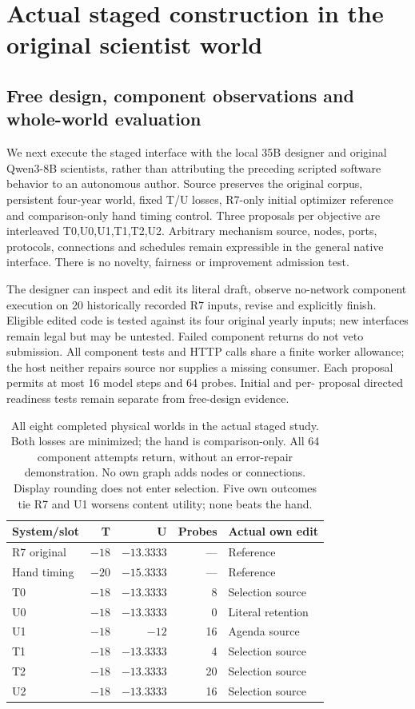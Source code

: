 \section{Actual staged construction in the original scientist world}
\label{sec:native-staged-construction}
\subsection{Free design, component observations and whole-world evaluation}
We next execute the staged interface with the local 35B designer and original
Qwen3-8B scientists, rather than attributing the preceding scripted software
behavior to an autonomous author. Source  preserves the original
corpus, persistent four-year world, fixed T/U losses, R7-only initial optimizer
reference and comparison-only hand timing control. Three proposals per
objective are interleaved T0,U0,U1,T1,T2,U2. Arbitrary mechanism source, nodes,
ports, protocols, connections and schedules remain expressible in the general
native interface. There is no novelty, fairness or improvement admission test.

The designer can inspect and edit its literal draft, observe no-network
component execution on 20 historically recorded R7 inputs, revise and explicitly
finish. Eligible edited code is tested against its four original yearly inputs;
new interfaces remain legal but may be untested. Failed component returns do
not veto submission. All component tests and HTTP calls share a finite worker
allowance; the host neither repairs source nor supplies a missing consumer.
Each proposal permits at most 16 model steps and 64 probes. Initial and per-
proposal directed readiness tests remain separate from free-design evidence.

\begin{table}[htbp]
\centering\small
\begin{tabular}{lrrrl}
\toprule
System/slot & T & U & Probes & Actual own edit\\
\midrule
R7 original & $-18$ & $-13.3333$ & --- & Reference\\
Hand timing & $-20$ & $-15.3333$ & --- & Reference\\
T0 & $-18$ & $-13.3333$ & 8 & Selection source\\
U0 & $-18$ & $-13.3333$ & 0 & Literal retention\\
U1 & $-18$ & $-12$ & 16 & Agenda source\\
T1 & $-18$ & $-13.3333$ & 4 & Selection source\\
T2 & $-18$ & $-13.3333$ & 20 & Selection source\\
U2 & $-18$ & $-13.3333$ & 16 & Selection source\\
\bottomrule
\end{tabular}
\caption{All eight completed physical worlds in the actual staged study.
Both losses are minimized; the hand is comparison-only. All 64 component
attempts return, without an error-repair demonstration. No own graph adds
nodes or connections. Display rounding does not enter selection. Five own
outcomes tie R7 and U1 worsens content utility; none beats the hand.}
\label{tab:actual-staged-development}
\end{table}

